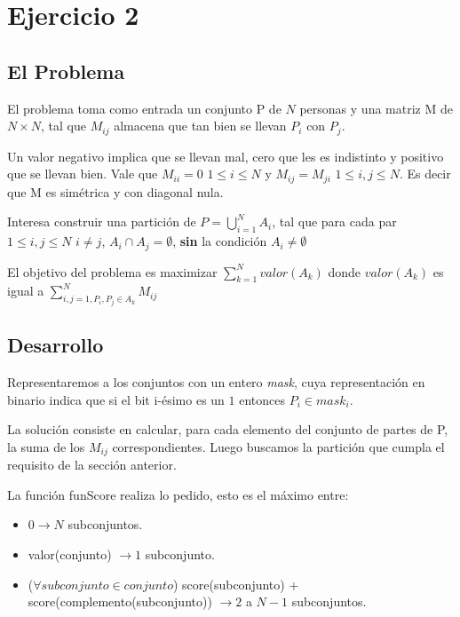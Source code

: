\section{Ejercicio 2}

\subsection{El Problema}

El problema toma como entrada un conjunto P de $N$ personas y una matriz M de $N \times N$, tal que $M_{ij}$ almacena que tan bien se llevan $P_i$ con $P_j$.

Un valor negativo implica que se llevan mal, cero que les es indistinto y positivo que se llevan bien. Vale que $M_{ii} = 0$ $1 \leq i \leq N$ y $M_{ij} = M_{ji}$  $1 \leq i, j \leq N$. Es decir que M es sim\'etrica y con diagonal nula. 

Interesa construir una partici\'on de $P = \bigcup\limits_{i = 1}^{N} A_i$, tal que para cada par $1 \leq i, j \leq N$ $i \neq j$, $A_i \cap A_j = \emptyset$, \textbf{sin} la condici\'on $A_i \neq \emptyset$

El objetivo del problema es maximizar $\displaystyle\sum_{k = 1}^{N} valor(A_k)$ donde $valor(A_k)$ es igual a $\displaystyle\sum_{i,j = 1, P_i, P_j \in A_k}^{N} M_{ij}$

\subsection{Desarrollo}

Representaremos a los conjuntos con un entero \textit{mask}, cuya representaci\'on en binario indica que si el bit i-\'esimo es un $1$ entonces $P_i \in mask_i$.

La soluci\'on consiste en calcular, para cada elemento del conjunto de partes de P, la suma de los $M_{ij}$ correspondientes. Luego buscamos la partici\'on que cumpla el requisito de la secci\'on anterior.

La funci\'on funScore realiza lo pedido, esto es el m\'aximo entre:

\begin{itemize}
	\item $0 \rightarrow N$ subconjuntos.
	\item valor(conjunto) $\rightarrow 1$ subconjunto.
	\item ($\forall subconjunto \in conjunto$) score(subconjunto) + score(complemento(subconjunto)) $\rightarrow 2$ a $N-1$ subconjuntos.
\end{itemize}

